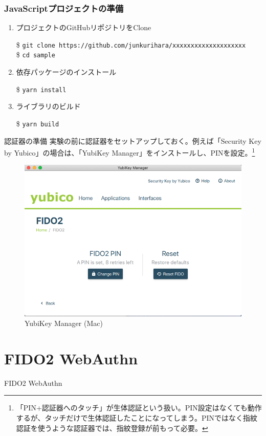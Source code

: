 \documentclass[12pt,dvipdfmx,uplatex]{beamer}
\begin{document}
\begin{frame}
\frametitle{JavaScriptプロジェクトの準備}
\begin{enumerate}
\item \alert{プロジェクトのGitHubリポジトリをClone}\\
\begin{exampleblock}{}
\footnotesize
\$ \texttt{git clone https://github.com/junkurihara/xxxxxxxxxxxxxxxxxxxx}\\
\$ \texttt{cd sample}
\end{exampleblock}
\item 依存パッケージのインストール
\begin{exampleblock}{}
\$ \texttt{yarn install}
\end{exampleblock}
\item ライブラリのビルド
\begin{exampleblock}{}
\$ \texttt{yarn build}
\end{exampleblock}
\end{enumerate}
\end{frame}

\begin{frame}{認証器の準備}
実験の前に認証器をセットアップしておく。例えば「Security Key by Yubico」の場合は、「YubiKey Manager」をインストールし、PINを設定。\footnote[frame]{\scriptsize 「PIN+認証器へのタッチ」が生体認証という扱い。PIN設定はなくても動作するが、タッチだけで生体認証したことになってしまう。PINではなく指紋認証を使うような認証器では、指紋登録が前もって必要。}
\begin{figure}
\begin{center}
\includegraphics[width=0.4\linewidth]{Figs/yubikey-manager.png}
\end{center}
\caption{YubiKey Manager (Mac)}
\end{figure}
\end{frame}


\section{FIDO2 WebAuthn}
\begin{frame}
\centering
{\huge FIDO2 WebAuthn}
\end{frame}
\end{document}
